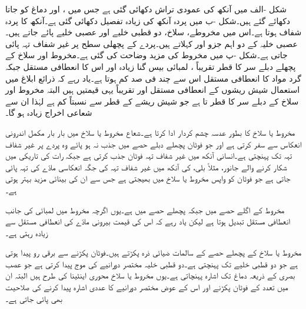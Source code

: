 شکل -الف میں آنکھ کی عمودی تراش دکھائی گئی ہے جس میں ،  اور دماغ کو جاتا  دکھائے گئے ہیں۔شکل -ب میں پردہ آنکھ کی زیادہ تفصیل دکھائی گئی ہے۔آنکھ کا پردہ شفاف ہوتا ہے۔اس میں مخروطے، سلاخ، دو قطبی خلیے اور  عصبی خلیے پائے جاتے ہیں۔عصبی خلیہ کے دو اہم جزو  اور  کہلاتے ہیں۔پردے کے پچھلی سطح پر غیر شفاف تہہ پائی جاتی ہے۔شکل -پ میں مخروط کی مزید وضاحت  کی گئی ہے۔مخروط اور سلاخ کے  پچھلے دبلے سر کا قطر تقریباً ، لمبائی بیس گنا زیادہ اور اس کا  انعطافی مستقل  جبکہ گرد مواد کا  انعطافی مستقل  اس سے چند فی صد کم ہوتا ہے۔یاد رہے کہ ذرائع ابلاغ میں استعمال شیش ریشوں کے  انعطافی مستقل  اور  تقریباً یہی قیمتیں ہیں البتہ مخروط اور سلاخ کے دبلے سر کا قطر  تا  ہے جو شیش ریشے کے قطر سے نسبتاً کم ہے لہٰذا ان سے شعاعی اخراج زیادہ ہو گا۔

مخروط یا سلاخ کا  بطور عدسہ چشم کردار ادا کرتا ہے۔شعاع مخروط یا سلاخ میں بار بار مکمل اندرونی انعکاس سے سفر کرتی ہے اور جو فوٹان پچھلے دبلے حصے میں جذب نہ ہو پائے وہ پردے پر غیر شفاف تہہ تک پہنچتی ہے۔انسانی آنکھ میں غیر شفاف تہہ فوٹان جذب کرتی ہے جبکہ رات کی تاریکی میں شکار کرنے والے جانور، مثلاً بلی،  کی آنکھ میں غیر شفاف تہہ کی جگہ انعکاسی مادّے کی تہہ پائی جاتی ہے جو فوٹان کو واپس مخروط یا سلاخ میں بھیجتی ہے جس سے ان کی بینائی مزید بہتر ہوتی ہے۔ 

مخروط کے اگلے حصے میں  جبکہ پچھلے حصے میں  ہے۔یوں اگرچہ مخروط میں لمبائی کی جانب  انعطافی مستقل تبدیل ہوتا ہے لیکن یاد رہے کہ اس کی قیمت بیرونی مادّے کی  انعطافی مستقل سے زیادہ رہتی ہے۔

مخروط یا سلاخ کے پچھلے حصے کے   سالمات ضیائی ذرہ پکڑتے ہیں۔فوٹان پکڑنے سے برقی رو پیدا ہوتی ہے جو دو قطبی خلیے تک پہنچتی ہے۔دو قطبی خلیہ مختصر دورانیے کی موج پیدا کرتی ہے جو عصب بصری کے ذریعہ دماغ تک اشارہ پہنچاتی ہے۔یوں مخروط یا سلاخ محوری اینٹینا کی طرح ہیں البتہ ان میں  تعدد کے فوٹان پکڑنے اور اس کے عوض مختصر دورانیے کا عددی اشارہ پیدا کرنے کی صلاحیت بھی پائی جاتی ہے۔  

